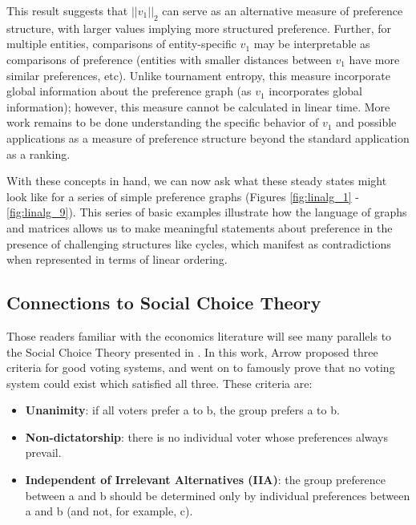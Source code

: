 This result suggests that $||v_1||_2$ can serve as an alternative measure of preference structure, with larger values implying more structured preference.
Further, for multiple entities, comparisons of entity-specific $v_1$ may be interpretable as comparisons of preference (entities with smaller distances between $v_1$ have more similar preferences, etc).
Unlike tournament entropy, this measure incorporate global information about the preference graph (as $v_1$ incorporates global information); however, this measure cannot be calculated in linear time.
More work remains to be done understanding the specific behavior of $v_1$ and possible applications as a measure of preference structure beyond the standard application as a ranking.

\bigskip

With these concepts in hand, we can now ask what these steady states might look like for a series of simple preference graphs (Figures \ref{fig:linalg_1} - \ref{fig:linalg_9}).
This series of basic examples illustrate how the language of graphs and matrices allows us to make meaningful statements about preference in the presence of challenging structures like cycles, which manifest as contradictions when represented in terms of linear ordering.





\FloatBarrier

\subsection{Connections to Social Choice Theory}

Those readers familiar with the economics literature will see many parallels to the Social Choice Theory presented in \cite{arrow}.
In this work, Arrow proposed three criteria for good voting systems, and went on to famously prove that no voting system could exist which satisfied all three.
These criteria are:

\begin{itemize}
	\item \textbf{Unanimity}: if all voters prefer a to b, the group prefers a to b.
	\item \textbf{Non-dictatorship}: there is no individual voter whose preferences always prevail.
	\item \textbf{Independent of Irrelevant Alternatives (IIA)}: the group preference between a and b should be determined only by individual preferences between a and b (and not, for example, c).
\end{itemize}

